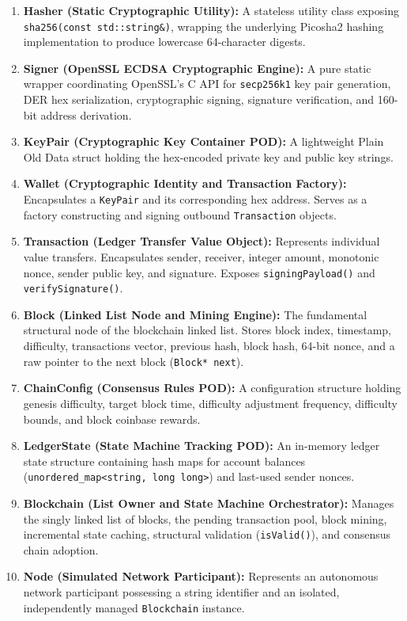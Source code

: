 \documentclass[11pt,a4paper]{report}
\begin{document}
\begin{enumerate}
    \item \textbf{Hasher (Static Cryptographic Utility):} A stateless utility class exposing \texttt{sha256(const std::string\&)}, wrapping the underlying Picosha2 hashing implementation to produce lowercase 64-character digests.
    
    \item \textbf{Signer (OpenSSL ECDSA Cryptographic Engine):} A pure static wrapper coordinating OpenSSL's C API for \texttt{secp256k1} key pair generation, DER hex serialization, cryptographic signing, signature verification, and 160-bit address derivation.
    
    \item \textbf{KeyPair (Cryptographic Key Container POD):} A lightweight Plain Old Data struct holding the hex-encoded private key and public key strings.
    
    \item \textbf{Wallet (Cryptographic Identity and Transaction Factory):} Encapsulates a \texttt{KeyPair} and its corresponding hex address. Serves as a factory constructing and signing outbound \texttt{Transaction} objects.
    
    \item \textbf{Transaction (Ledger Transfer Value Object):} Represents individual value transfers. Encapsulates sender, receiver, integer amount, monotonic nonce, sender public key, and signature. Exposes \texttt{signingPayload()} and \texttt{verifySignature()}.
    
    \item \textbf{Block (Linked List Node and Mining Engine):} The fundamental structural node of the blockchain linked list. Stores block index, timestamp, difficulty, transactions vector, previous hash, block hash, 64-bit nonce, and a raw pointer to the next block (\texttt{Block* next}).
    
    \item \textbf{ChainConfig (Consensus Rules POD):} A configuration structure holding genesis difficulty, target block time, difficulty adjustment frequency, difficulty bounds, and block coinbase rewards.
    
    \item \textbf{LedgerState (State Machine Tracking POD):} An in-memory ledger state structure containing hash maps for account balances (\texttt{unordered\_map<string, long long>}) and last-used sender nonces.
    
    \item \textbf{Blockchain (List Owner and State Machine Orchestrator):} Manages the singly linked list of blocks, the pending transaction pool, block mining, incremental state caching, structural validation (\texttt{isValid()}), and consensus chain adoption.
    
    \item \textbf{Node (Simulated Network Participant):} Represents an autonomous network participant possessing a string identifier and an isolated, independently managed \texttt{Blockchain} instance.
\end{enumerate}
\end{document}
